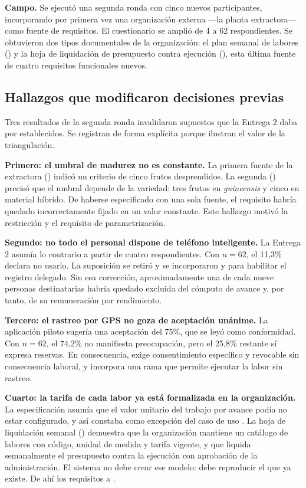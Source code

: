 \textbf{Campo.} Se ejecutó una segunda ronda con cinco nuevos participantes, incorporando por
primera vez una organización externa ---la planta extractora--- como fuente de requisitos. El
cuestionario se amplió de 4 a 62 respondientes. Se obtuvieron dos tipos documentales de la
organización: el plan semanal de labores () y la hoja de liquidación de presupuesto contra
ejecución (), esta última fuente de cuatro requisitos funcionales nuevos.

\subsection{Hallazgos que modificaron decisiones previas}

Tres resultados de la segunda ronda invalidaron supuestos que la Entrega 2 daba por establecidos.
Se registran de forma explícita porque ilustran el valor de la triangulación.

\textbf{Primero: el umbral de madurez no es constante.} La primera fuente de la extractora
() indicó un criterio de cinco frutos desprendidos. La segunda () precisó que el
umbral depende de la variedad: tres frutos en \emph{guineensis} y cinco en material híbrido. De
haberse especificado  con una sola fuente, el requisito habría quedado incorrectamente
fijado en un valor constante. Este hallazgo motivó la restricción  y el requisito
 de parametrización.

\textbf{Segundo: no todo el personal dispone de teléfono inteligente.} La Entrega 2 asumía lo
contrario a partir de cuatro respondientes. Con $n=62$, el 11{,}3\% declara no usarlo. La suposición
se retiró y se incorporaron  y  para habilitar el registro delegado. Sin esa
corrección, aproximadamente una de cada nueve personas destinatarias habría quedado excluida del
cómputo de avance y, por tanto, de su remuneración por rendimiento.

\textbf{Tercero: el rastreo por GPS no goza de aceptación unánime.} La aplicación piloto sugería
una aceptación del 75\%, que se leyó como conformidad. Con $n=62$, el 74{,}2\% no manifiesta
preocupación, pero el 25{,}8\% restante sí expresa reservas. En consecuencia,  exige
consentimiento específico y revocable sin consecuencia laboral, y  incorpora una rama que
permite ejecutar la labor sin rastreo.

\textbf{Cuarto: la tarifa de cada labor ya está formalizada en la organización.} La
especificación asumía que el valor unitario del trabajo por avance podía no estar configurado, y así
constaba como excepción del caso de uso . La hoja de liquidación semanal ()
demuestra que la organización mantiene un catálogo de labores con código, unidad de medida y tarifa
vigente, y que liquida semanalmente el presupuesto contra la ejecución con aprobación de la
administración. El sistema no debe crear ese modelo: debe reproducir el que ya existe. De ahí los
requisitos  a .

